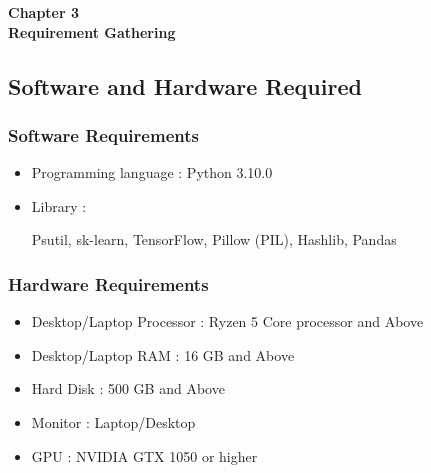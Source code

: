 \documentclass[12pt]{article}
\begin{document}
\vspace*{\fill}
\begin{center}
    {\Large \bf Chapter 3} \\[1em] %
    {\Large \bf Requirement Gathering}
\end{center}
\vspace*{\fill}

\newpage


\vspace{15pt} %

\setcounter{section}{3}


\subsection{Software and Hardware Required}
\vspace{10pt}

\subsubsection{Software Requirements}
\begin{itemize}[left=0pt]
    \item {Programming language} \hspace{2.3cm} : Python 3.10.0
    \item {Library} \hspace{5cm} : \parbox[t]{\dimexpr\textwidth-10cm}{Psutil, sk-learn, TensorFlow, Pillow (PIL), Hashlib, Pandas}
\end{itemize}


\vspace{10pt}
\subsubsection{Hardware Requirements}

\begin{itemize}[left=0pt]
    \item {Desktop/Laptop Processor} \hspace{1.8cm} : Ryzen 5 Core processor and Above
    \item {Desktop/Laptop RAM} \hspace{2.5cm} : 16 GB and Above
    \item {Hard Disk} \hspace{4.5cm} : 500 GB and Above
    \item {Monitor} \hspace{4.9cm} : Laptop/Desktop
    \item {GPU} \hspace{5.4cm} : NVIDIA GTX 1050 or higher 
\end{itemize}
\end{document}
